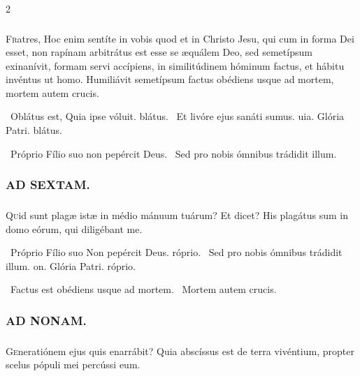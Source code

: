 \documentclass[9pt,twoside]{extarticle}
\begin{document}
\begin{multicols}{2}
\subsubsection*{}
\lettrine{F}ratres, Hoc enim sentíte in vobis quod et in Christo Jesu, qui cum in forma Dei esset, non rapínam arbitrátus est esse se æquálem Deo, sed semetípsum exinanívit, formam servi accípiens, in similitúdinem hóminum factus, et hábitu invéntus ut homo. Humiliávit semetípsum factus obédiens usque ad mortem, mortem autem crucis.

\begin{tightlist}{}
\item {}~Oblátus est, \textred{*} Quia ipse vóluit. blátus. ~Et livóre ejus sanáti sumus. uia. Glória Patri. blátus. 
\item {}~Próprio Fílio suo non pepércit Deus. ~Sed pro nobis ómnibus trádidit illum.
\end{tightlist}

\subsubsection*{\center \textsc{AD SEXTAM.}}
\subsubsection*{}
\lettrine{Q}uid sunt plagæ istæ in médio mánuum tuárum? Et dicet? His plagátus sum in domo eórum, qui diligébant me.

\begin{tightlist}{}
\item {}~Próprio Fílio suo \textred{*} Non pepércit Deus. róprio. ~Sed pro nobis ómnibus trádidit illum. on. Glória Patri. róprio.
\item {}~Factus est obédiens usque ad mortem. ~Mortem autem crucis.
\end{tightlist}

\subsubsection*{\center \textsc{AD NONAM.}}
\subsubsection*{}
\lettrine{G}eneratiónem ejus quis enarrábit? Quia abscíssus est de terra vivéntium, propter scelus pópuli mei percússi eum.


\end{multicols}
\end{document}
